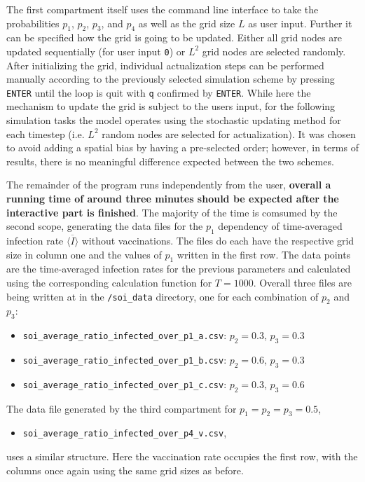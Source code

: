 The first compartment itself uses the command line interface to take the probabilities $p_1$, $p_2$, $p_3$, and $p_4$ as well as the grid size $L$ as user input. Further it can be specified how the grid is going to be 
updated. Either all grid nodes are updated sequentially (for user input \texttt{0}) or $L^2$ grid nodes are selected randomly. After initializing the grid, 
individual actualization steps can be performed manually according to the previously selected simulation scheme by pressing \texttt{ENTER} until the loop is quit with \texttt{q} confirmed by \texttt{ENTER}.
While here the mechanism to update the grid is subject to the users input, for the following simulation tasks the model operates using the stochastic updating method for each timestep 
(i.e. $L^2$ random nodes are selected for actualization). It was chosen to avoid adding a spatial bias by having a pre-selected order; however,
in terms of results, there is no meaningful difference expected between the two schemes.

The remainder of the program runs independently from the user, \textbf{overall a running time of around three minutes should be expected after the interactive part is finished}. 
The majority of the time is comsumed by the second scope, generating the data files for the $p_1$ dependency of time-averaged infection rate $\overline{\langle I\rangle}$ without vaccinations.
The files do each have the respective grid size in column one and the values of $p_1$ written in the first row. The data points are the time-averaged infection rates for the previous parameters and calculated
using the corresponding calculation function for $T=1000$. Overall three files are being written at in the \texttt{/soi\_data} directory, one for each combination of $p_2$ and $p_3$:
\begin{itemize}
    \item \texttt{soi\_average\_ratio\_infected\_over\_p1\_a.csv}: $p_2=0.3$, $p_3=0.3$
    \item \texttt{soi\_average\_ratio\_infected\_over\_p1\_b.csv}: $p_2=0.6$, $p_3=0.3$
    \item \texttt{soi\_average\_ratio\_infected\_over\_p1\_c.csv}: $p_2=0.3$, $p_3=0.6$
\end{itemize}

The data file generated by the third compartment for $p_1=p_2=p_3=0.5$,
\begin{itemize}
    \item \texttt{soi\_average\_ratio\_infected\_over\_p4\_v.csv},
\end{itemize}
uses a similar structure. Here the vaccination rate occupies the first row, with the columns once again using the same grid sizes as before.

